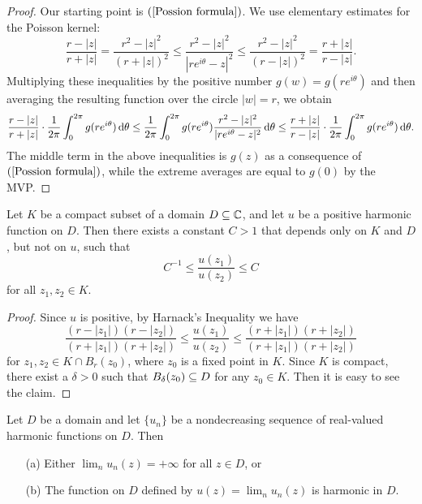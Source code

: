 \begin{proof}
Our starting point is $(\ref{Possion formula})$. We use elementary estimates for the Poisson kernel:
\[\frac{r-|z|}{r+|z|}=\frac{r^2-|z|^2}{(r+|z|)^2}\leq\frac{r^2-|z|^2}{|re^{i\theta}-z|^2}\leq\frac{r^2-|z|^2}{(r-|z|)^2}=\frac{r+|z|}{r-|z|}.\]
Multiplying these inequalities by the positive number $g(w)=g(re^{i\theta})$ and then averaging the resulting function over the circle $|w|=r$, we obtain
\begin{align*}
\frac{r-|z|}{r+|z|}\cdot\frac{1}{2\pi}\int_{0}^{2\pi}g(re^{i\theta})\mathop{}\!\mathrm{d}\theta\leq\frac{1}{2\pi}\int_{0}^{2\pi}g(re^{i\theta})\frac{r^2-|z|^2}{|re^{i\theta}-z|^2}\mathop{}\!\mathrm{d}\theta\leq\frac{r+|z|}{r-|z|}\cdot\frac{1}{2\pi}\int_{0}^{2\pi}g(re^{i\theta})\mathop{}\!\mathrm{d}\theta.
\end{align*}
The middle term in the above inequalities is $g(z)$ as a consequence of $(\ref{Possion formula})$, while the extreme averages are equal to $g(0)$ by the MVP.
\end{proof}
\begin{corollary}\label{Harnack's Inequality compact set}
Let $K$ be a compact subset of a domain $D\subseteq\mathbb{C}$, and let $u$ be a positive harmonic function on $D$. Then there exists a constant $C>1$ that depends only on $K$ and $D$, but not on $u$, such that
\[C^{-1}\leq\frac{u(z_1)}{u(z_2)}\leq C\]
for all $z_1,z_2\in K$.
\end{corollary}
\begin{proof}
Since $u$ is positive, by Harnack's Inequality we have
\[\frac{(r-|z_1|)(r-|z_2|)}{(r+|z_1|)(r+|z_2|)}\leq\frac{u(z_1)}{u(z_2)}\leq\frac{(r+|z_1|)(r+|z_2|)}{(r+|z_1|)(r+|z_2|)}\]
for $z_1,z_2\in K\cap B_{r}(z_0)$, where $z_0$ is a fixed point in $K$. Since $K$ is compact, there exist a $\delta>0$ such that $B_{\delta}(z_0)\subseteq D$ for any $z_0\in K$. Then it is easy to see the claim.
\end{proof}
\begin{theorem}
Let $D$ be a domain and let $\{u_n\}$ be a nondecreasing sequence of real-valued harmonic functions on $D$. Then
\begin{itemize}
\item[(a)] Either $\lim_nu_n(z)=+\infty$ for all $z\in D$, or
\item[(b)] The function on $D$ defined by $u(z)=\lim_nu_n(z)$ is harmonic in $D$.
\end{itemize}
\end{theorem}
